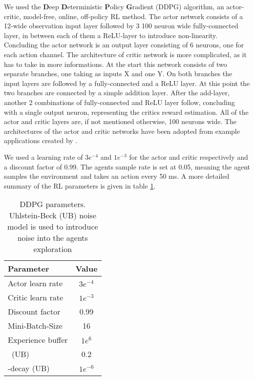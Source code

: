 We used the \textbf{D}eep \textbf{D}eterministic \textbf{P}olicy \textbf{G}radient (DDPG) algorithm, an actor-critic, model-free, online, off-policy RL method.
The actor network consists of a 12-wide observation input layer followed by 3 100 neuron wide fully-connected layer, in between each of them a ReLU-layer to introduce non-linearity.
Concluding the actor network is an output layer consisting of 6 neurons, one for each action channel.
The architecture of critic network is more complicated, as it has to take in more informations.
At the start this network consists of two separate branches, one taking as inputs X and one Y.
On both branches the input layers are followed by a fully-connected and a ReLU layer.
At this point the two branches are connected by a simple addition layer.
After the add-layer, another 2 combinations of fully-connected and ReLU layer follow, concluding with a single output neuron, representing the critics reward estimation.
All of the actor and critic layers are, if not mentioned otherwise, 100 neurons wide.
The architectures of the actor and critic networks have been adopted from example applications created by \cite{matlabDDPGExample, matlabPPOExample}.

We used a learning rate of $3e^{-4}$ and $1e^{-3}$ for the actor and critic respectively and a discount factor of 0.99.
The agents sample rate is set at 0.05, meaning the agent samples the environment and takes an action every 50 ms.
A more detailed summary of the RL parameters is given in table \ref{table: DDPG parameters}.

{\def\arraystretch{1.4}\tabcolsep=5pt
\begin{table}
	\centering
	\begin{tabular}{| l | c |}
		\hline
		\textbf{Parameter} & \textbf{Value}\\
		\hline
		\hline
		Actor learn rate & $3e^{-4}$ \\
		Critic learn rate & $1e^{-3}$ \\
		Discount factor &  0.99 \\
		Mini-Batch-Size & 16 \\
		Experience buffer & $1e^6$\\
		\textsigma \ (UB) & 0.2 \\
		\textsigma-decay (UB) & $1e^{-6}$ \\
		
		\hline
	\end{tabular}
	\caption[DDPG parameters]{DDPG parameters. Uhlstein-Beck (UB) noise model is used to introduce noise into the agents exploration}
	\label{table: DDPG parameters}
\end{table}
}


